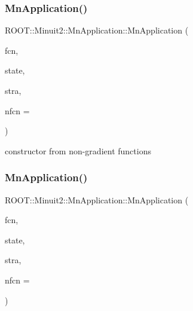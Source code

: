 \subsubsection{\texorpdfstring{MnApplication()}{MnApplication()}\hspace{0.1cm}{\footnotesize\ttfamily [1/6]}}
{\footnotesize\ttfamily R\+O\+O\+T\+::\+Minuit2\+::\+Mn\+Application\+::\+Mn\+Application (\begin{DoxyParamCaption}\item[{const \mbox{\hyperlink{classROOT_1_1Minuit2_1_1FCNBase}{F\+C\+N\+Base}} \&}]{fcn,  }\item[{const \mbox{\hyperlink{classROOT_1_1Minuit2_1_1MnUserParameterState}{Mn\+User\+Parameter\+State}} \&}]{state,  }\item[{const \mbox{\hyperlink{classROOT_1_1Minuit2_1_1MnStrategy}{Mn\+Strategy}} \&}]{stra,  }\item[{unsigned int}]{nfcn = {} }\end{DoxyParamCaption})}



constructor from non-\/gradient functions 

\mbox{\label{classROOT_1_1Minuit2_1_1MnApplication_a07b6eb3c240c0d2360d466ab1f1a85ec}} 
\subsubsection{\texorpdfstring{MnApplication()}{MnApplication()}\hspace{0.1cm}{\footnotesize\ttfamily [2/6]}}
{\footnotesize\ttfamily R\+O\+O\+T\+::\+Minuit2\+::\+Mn\+Application\+::\+Mn\+Application (\begin{DoxyParamCaption}\item[{const \mbox{\hyperlink{classROOT_1_1Minuit2_1_1FCNGradientBase}{F\+C\+N\+Gradient\+Base}} \&}]{fcn,  }\item[{const \mbox{\hyperlink{classROOT_1_1Minuit2_1_1MnUserParameterState}{Mn\+User\+Parameter\+State}} \&}]{state,  }\item[{const \mbox{\hyperlink{classROOT_1_1Minuit2_1_1MnStrategy}{Mn\+Strategy}} \&}]{stra,  }\item[{unsigned int}]{nfcn = {} }\end{DoxyParamCaption})}




